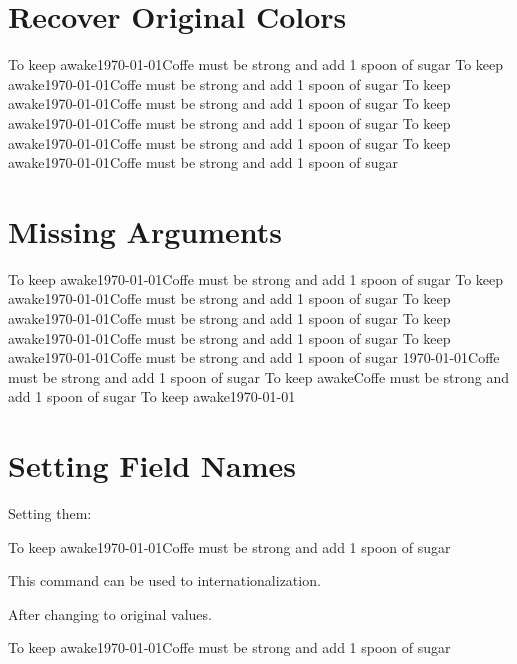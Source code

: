 \documentclass[12pt,a4paper]{article}
\begin{document}
\section{Recover Original Colors}
%
{To keep awake}{\today}{Coffe must be strong and add 1 spoon of sugar}
%
{To keep awake}{\today}{Coffe must be strong and add 1 spoon of sugar}
%
{To keep awake}{\today}{Coffe must be strong and add 1 spoon of sugar}
%
{To keep awake}{\today}{Coffe must be strong and add 1 spoon of sugar}
%
{To keep awake}{\today}{Coffe must be strong and add 1 spoon of sugar}
%
{To keep awake}{\today}{Coffe must be strong and add 1 spoon of sugar}

\section{Missing Arguments}
%
{To keep awake}{\today}{Coffe must be strong and add 1 spoon of sugar}
%
{To keep awake}{\today}{Coffe must be strong and add 1 spoon of sugar}
%
{To keep awake}{\today}{Coffe must be strong and add 1 spoon of sugar}
%
{To keep awake}{\today}{Coffe must be strong and add 1 spoon of sugar}
%
{To keep awake}{\today}{Coffe must be strong and add 1 spoon of sugar}
%
{}{\today}{Coffe must be strong and add 1 spoon of sugar}
%
{To keep awake}{}{Coffe must be strong and add 1 spoon of sugar}
%
{To keep awake}{\today}{}

\section{Setting Field Names}

Setting them:

%
{To keep awake}{\today}{Coffe must be strong and add 1 spoon of sugar}

 This command can be used to internationalization.

After changing to original values.

%
{To keep awake}{\today}{Coffe must be strong and add 1 spoon of sugar}

\newpage
\setlength{\cfttasksnumwidth}{20pt}
\newpage
\listoftasks
\end{document}
